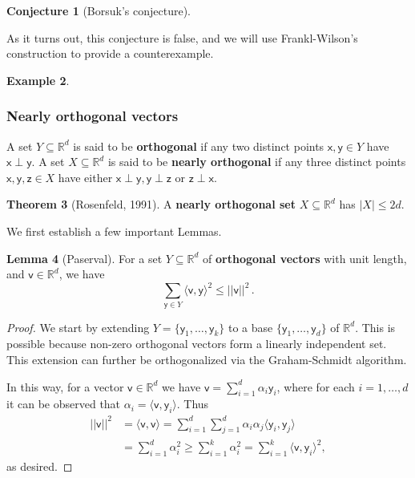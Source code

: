 \documentclass[12pt]{amsart}
\theoremstyle{definition}
\newtheorem{thm}{Theorem}[section]
\newtheorem{lm}[thm]{Lemma}
\newtheorem{smpl}[thm]{Example}
\newtheorem{conj}[thm]{Conjecture}
\newcommand{\R}{\mathbb{R}}
\newcommand{\vv}{\mathsf{v}}
\newcommand{\vx}{\mathsf{x}}
\newcommand{\vy}{\mathsf{y}}
\newcommand{\vz}{\mathsf{z}}
\begin{document}
\begin{conj}[Borsuk's conjecture]

\end{conj}

As it turns out, this conjecture is false, and we will use Frankl-Wilson's construction to provide a counterexample.


\begin{smpl}
\end{smpl}

\subsubsection*{Nearly orthogonal vectors}

A set $Y \subseteq \R^d$ is said to be \textbf{orthogonal} if any two distinct points $\vx, \vy \in Y$ have $\vx \perp \vy$.
A set $X\subseteq \R^d$ is said to be \textbf{nearly orthogonal} if any three distinct points $\vx, \vy, \vz \in X $ have either $\vx\perp \vy, \vy\perp\vz$ or $\vz\perp\vx$.


\begin{thm}[Rosenfeld, 1991]\label{thm:nearly}
A \textbf{nearly orthogonal set} $X\subseteq \R^d$ has $|X| \leq 2d$.
\end{thm}

We first establish a few important Lemmas.

\begin{lm}[Paserval]\label{lm:paserval}
For a set $Y \subseteq \R^d$ of \textbf{orthogonal vectors} with unit length, and $\vv \in \R^d$, we have 
$$ \sum_{\vy \in Y} \langle \vv, \vy\rangle^2 \leq ||\vv ||^2 \, . $$
\end{lm}

\begin{proof}
We start by extending $Y = \{\vy_1, \ldots, \vy_k\}$ to a base $\{\vy_1, \ldots, \vy_d\}$ of $\R^d$.
This is possible because non-zero orthogonal vectors form a linearly independent set. 
This extension can further be orthogonalized via the Graham-Schmidt algorithm.

In this way, for a vector $\vv\in \R^d$ we have $\vv = \sum_{i=1}^d \alpha_i \vy_i$, where for each $i=1, \ldots, d$ it can be observed that $\alpha_i = \langle \vv, \vy_i\rangle$.
Thus 
\begin{align*}
|| \vv ||^2 &= \langle \vv, \vv \rangle  = \sum_{i=1}^d \sum_{j=1}^d \alpha_i \alpha_j  \langle \vy_i,  \vy_j \rangle \\ 
&= \sum_{i=1}^d \alpha_i^2 \geq \sum_{i=1}^k \alpha_i^2 = \sum_{i=1}^k \langle \vv, \vy_i\rangle^2,
\end{align*}
as desired.
\end{proof}
\end{document}
